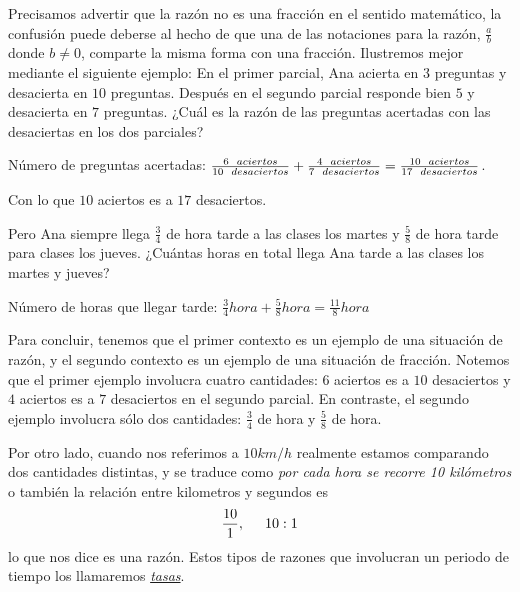 \documentclass[
  11pt,
]{book}
\begin{document}
Precisamos advertir que la razón no es una fracción en el sentido matemático, la confusión puede deberse al hecho de que una de las notaciones para la razón, \(\frac{a}{b}\) donde \(b\neq 0\), comparte la misma forma con una fracción. Ilustremos mejor mediante el siguiente ejemplo:
En el primer parcial, Ana acierta en \(3\) preguntas y desacierta en \(10\) preguntas. Después en el segundo parcial responde bien \(5\) y desacierta en \(7\) preguntas. ¿Cuál es la razón de las preguntas acertadas con las desaciertas en los dos parciales?

Número de preguntas acertadas:
\(\frac{6 \hspace{2mm} aciertos}{10 \hspace{2mm} desaciertos}+\frac{4\hspace{2mm} aciertos}{7\hspace{2mm} desaciertos}=\frac{10 \hspace{2mm} aciertos}{17 \hspace{2mm} desaciertos}\).

Con lo que \(10\) aciertos es a \(17\) desaciertos.

Pero Ana siempre llega \(\frac{3}{4}\) de hora tarde a las clases los martes y \(\frac{5}{8}\) de hora tarde para clases los jueves. ¿Cuántas horas en total llega Ana tarde a las clases los martes y jueves?

Número de horas que llegar tarde:
\(\frac{3}{4}hora+\frac{5}{8}hora=\frac{11}{8}hora\)

Para concluir, tenemos que el primer contexto es un ejemplo de una situación de razón, y el segundo contexto es un ejemplo de una situación de fracción. Notemos que el primer ejemplo involucra cuatro cantidades: \(6\) aciertos es a \(10\) desaciertos y \(4\) aciertos es a \(7\) desaciertos en el segundo parcial. En contraste, el segundo ejemplo involucra sólo dos cantidades: \(\frac{3}{4}\) de hora y \(\frac{5}{8}\) de hora.

Por otro lado, cuando nos referimos a \(10 km/h\) realmente estamos comparando dos cantidades distintas, y se traduce como \emph{por cada hora se recorre 10 kilómetros} o también la relación entre kilometros y segundos es
\[\begin{equation}
\frac{10}{1}, \hspace{5mm} 10:1
\end{equation}\]
lo que nos dice es una razón. Estos tipos de razones que involucran un periodo de tiempo los llamaremos \protect\hyperlink{tasas}{\emph{tasas}}.
\end{document}
